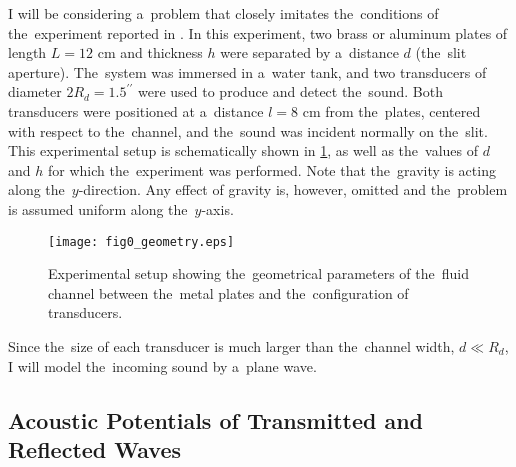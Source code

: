 I will be considering a~problem that closely imitates the~conditions of the~experiment reported in \cite{channel1}.
In this experiment, two brass or aluminum plates of length $L=12$ cm and thickness $h$ were separated by a~distance $d$ (the~slit aperture).
The~system was immersed in a~water tank, and two transducers
of diameter $2R_d=1.5^{\prime\prime}$ were used to produce and detect the~sound.
Both transducers were positioned at a~distance $l=8$ cm from the~plates, centered with respect to the~channel, and the~sound was incident normally on the~slit.
This experimental setup is schematically shown in \cref{fig:geometryRayleigh}, as well as the~values of $d$ and $h$ for which the~experiment was performed.
Note that the~gravity is acting along the~$y$-direction.
Any effect of gravity is, however, omitted and the~problem is assumed uniform along the~$y$-axis.

\begin{figure}
\begin{center}
\texttt{[image: fig0\_geometry.eps]}
\caption{Experimental setup showing the~geometrical parameters of the~fluid channel between the~metal plates and the~configuration of transducers.}
\label{fig:geometryRayleigh}
\end{center}
\end{figure}

Since the~size of each transducer is much larger than the~channel width, $d \ll R_d$, I will model the~incoming sound by a~plane wave. 



\subsection{Acoustic Potentials of Transmitted and Reflected Waves}

